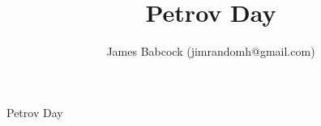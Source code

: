\documentclass{article}
\begin{document}
\author{James Babcock (jimrandomh@gmail.com)}
\title{Petrov Day}

\newcommand{\divider}{ %
	\nointerlineskip \vspace{\baselineskip}
	\hspace{\fill}\rule{0.5\linewidth}{.7pt}\hspace{\fill}
	\par\nointerlineskip \vspace{\baselineskip}
} %

\newcommand{\stagedir} [1] { %
	\begin{itshape}
	#1
	\end{itshape}
} %

\newcommand{\blockquote} [2] { %
	\begin{center}
		\parbox{3.5in}{
			``#1''
			\begin{flushright}
				--- #2
			\end{flushright}
		}
	\end{center}
} %

\newcommand{\blockquoteUnattributed} [1] { %
	\begin{center}
		\parbox{3.5in}{
			``#1''
		}
	\end{center}
} %

\newcommand{\blockquoteUnmarked} [2] { %
	\begin{center}
		\parbox{3.5in}{
			#1
			\begin{flushright}
				--- #2
			\end{flushright}
		}
	\end{center}
} %

\newcommand{\poem} [2] { %
	\begin{center}
		\parbox{3.5in}{
			#1
			\begin{flushright}
				--- #2
			\end{flushright}
		}
	\end{center}
} %

\newcommand{\readings} [1] { %
	\divider
	#1
	\divider
	\newpage
} %

\newcommand{\quoteAndStageDirPage} [1] { %
	\divider
	#1
	\divider
	\newpage
} %

\setlength{\parindent}{0cm}

\setlength{\parskip}{\baselineskip}

Petrov Day
\end{document}
